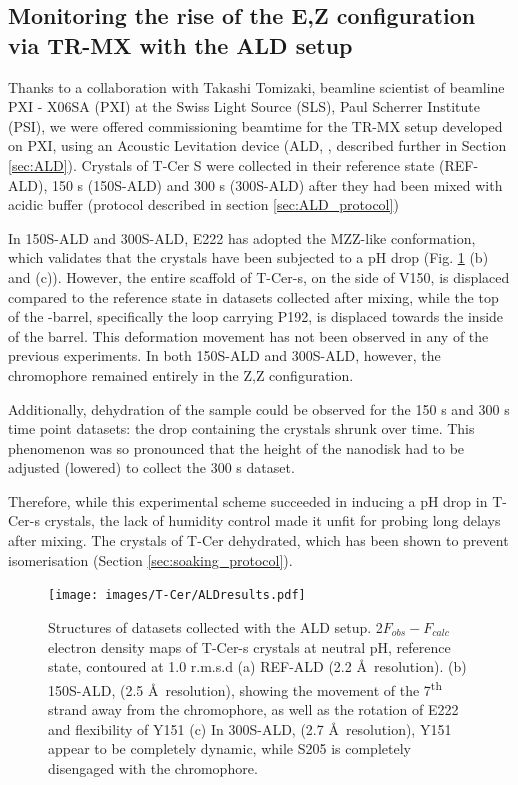 \subsection{Monitoring the rise of the E,Z configuration via TR-MX with the ALD setup}

Thanks to a collaboration with Takashi Tomizaki, beamline scientist of beamline PXI - X06SA (PXI) at the Swiss Light Source (SLS), Paul Scherrer Institute (PSI), we were offered commissioning beamtime for the TR-MX setup developed on PXI, using an Acoustic Levitation device (ALD, \cite{tsujinoUltrasonicAcousticLevitation2016, kepaAcousticLevitationRotation2022}, described further in Section \ref{sec:ALD}). Crystals of T-Cer S were collected in their reference state (REF-ALD), 150 s (150S-ALD) and 300 s (300S-ALD) after they had been mixed with acidic buffer (protocol described in section \ref{sec:ALD_protocol})

In 150S-ALD and 300S-ALD, E222 has adopted the MZZ-like conformation, which validates that the crystals have been subjected to a pH drop (Fig. \ref{fig:ALDresults} (b) and (c)). However, the entire scaffold of T-Cer-s, on the side of V150, is displaced compared to the reference state in datasets collected after mixing, while the top of the \textbeta-barrel, specifically the loop carrying P192, is displaced towards the inside of the barrel. This deformation movement has not been observed in any of the previous experiments. In both 150S-ALD and 300S-ALD, however, the chromophore remained entirely in the Z,Z configuration. 

Additionally, dehydration of the sample could be observed for the 150 s and 300 s time point datasets: the drop containing the crystals shrunk over time. This phenomenon was so pronounced that the height of the nanodisk had to be adjusted (lowered) to collect the 300 s dataset. 

\vspace{2mm} 

Therefore, while this experimental scheme succeeded in inducing a pH drop in T-Cer-s crystals, the lack of humidity control made it unfit for probing long delays after mixing. The crystals of T-Cer dehydrated, which has been shown to prevent isomerisation (Section \ref{sec:soaking_protocol}).  
\begin{figure}[H] 
    \centering
        \noindent \texttt{[image: images/T-Cer/ALDresults.pdf]}
    \caption{Structures of datasets collected with the ALD setup. 2\(F_{obs} - F_{calc}\) electron density maps of T-Cer-s crystals at neutral pH, reference state, contoured at 1.0 r.m.s.d (a) REF-ALD (2.2 \AA\  resolution). (b) 150S-ALD, (2.5 \AA\  resolution), showing the movement of the 7\textsuperscript{th} strand away from the chromophore, as well as the rotation of E222 and flexibility of Y151 (c) In 300S-ALD, (2.7 \AA\  resolution), Y151 appear to be completely dynamic, while S205 is completely disengaged with the chromophore.}\label{fig:ALDresults}
\end{figure}

